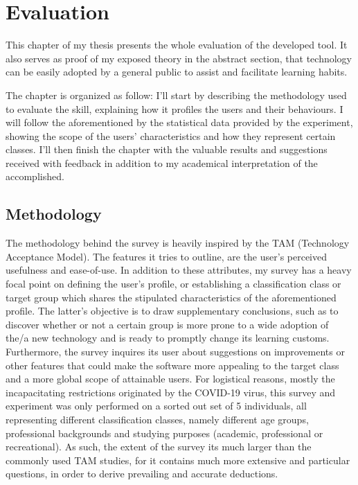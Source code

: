 \chapter{Evaluation}
\label{cha:evaluation}

This chapter of my thesis presents the whole evaluation of the developed tool. It also serves as proof of my exposed theory in the abstract section, that technology can be easily adopted by a general public to assist and facilitate learning habits.

The chapter is organized as follow: I'll start by describing the methodology used to evaluate the skill, explaining how it profiles the users and their behaviours. I will follow the aforementioned by the statistical data provided by the experiment, showing the scope of the users' characteristics and how they represent certain classes. I'll then finish the chapter with the valuable results and suggestions received with feedback in addition to my academical interpretation of the accomplished.


\section{Methodology}

The methodology behind the survey is heavily inspired by the TAM (Technology Acceptance Model). The features it tries to outline, are the user's perceived usefulness and ease-of-use. 
In addition to these attributes, my survey has a heavy focal point on defining the user's profile, or establishing a classification class or target group which shares the stipulated characteristics of the aforementioned profile. The latter's objective is to draw supplementary conclusions, such as to discover whether or not a certain group is more prone to a wide adoption of the/a new technology and is ready to promptly change its learning customs.
Furthermore, the survey inquires its user about suggestions on improvements or other features that could make the software more appealing to the target class and a more global scope of attainable users.
For logistical reasons, mostly the incapacitating restrictions originated by the COVID-19 virus, this survey and experiment was only performed on a sorted out set of 5 individuals, all representing different classification classes, namely different age groups, professional backgrounds and studying purposes (academic, professional or recreational).
As such, the extent of the survey its much larger than the commonly used TAM studies, for it contains much more extensive and particular questions, in order to derive prevailing and accurate deductions.


